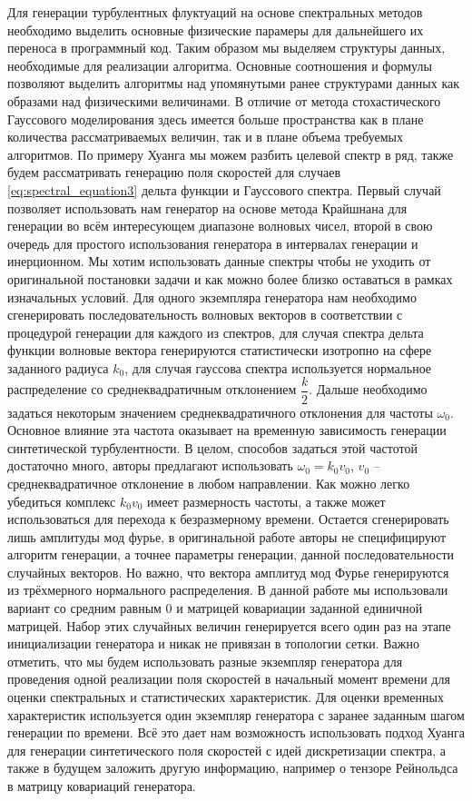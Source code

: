 Для генерации турбулентных флуктуаций на основе спектральных методов необходимо выделить основные физические парамеры для дальнейшего их переноса в программный код. Таким образом мы выделяем структуры данных, необходимые для реализации алгоритма. Основные соотношения и формулы позволяют выделить алгоритмы над упомянутыми ранее структурами данных как образами над физическими величинами. В отличие от метода стохастического Гауссового моделирования здесь имеется больше пространства как в плане количества рассматриваемых величин, так и в плане объема требуемых алгоритмов. По примеру Хуанга мы можем разбить целевой спектр в ряд, также будем рассматривать генерацию поля скоростей для случаев \eqref{eq:spectral_equation3} дельта функции и Гауссового спектра. Первый случай позволяет использовать нам генератор на основе метода Крайшнана для генерации во всём интересующем диапазоне волновых чисел, второй в свою очередь для простого использования генератора в интервалах генерации и инерционном. Мы хотим использовать данные спектры чтобы не уходить от оригинальной постановки задачи и как можно более близко оставаться в рамках изначальных условий. Для одного экземпляра генератора нам необходимо сгенерировать последовательность волновых векторов в соответствии с процедурой генерации для каждого из спектров, для случая спектра дельта функции волновые вектора генерируются статистически изотропно на сфере заданного радиуса $k_0$, для случая гауссова спектра используется нормальное распределение со среднеквадратичным отклонением $\dfrac{k}{2}$. Дальше необходимо задаться некоторым значением среднеквадратичного отклонения для частоты $\omega_0$. Основное влияние эта частота оказывает на временную зависимость генерации синтетической турбулентности. В целом, способов задаться этой частотой достаточно много, авторы предлагают использовать $\omega_0 = k_0 v_0$, $v_0$ -- среднеквадратичное отклонение в любом направлении. Как можно легко убедиться комплекс $k_0 v_0$ имеет размерность частоты, а также может использоваться для перехода к безразмерному времени. Остается сгенерировать лишь амплитуды мод фурье, в оригинальной работе авторы не специфицируют алгоритм генерации, а точнее параметры генерации, данной последовательности случайных векторов. Но важно, что вектора амплитуд мод Фурье генерируются из трёхмерного нормального распределения. В данной работе мы использовали вариант со средним равным 0 и матрицей ковариации заданной единичной матрицей. Набор этих случайных величин генерируется всего один раз на этапе инициализации генератора и никак не привязан в топологии сетки. Важно отметить, что мы будем использовать разные экземпляр генератора для проведения одной реализации поля скоростей в начальный момент времени для оценки спектральных и статистических характеристик. Для оценки временных характеристик используется один экземпляр генератора с заранее заданным шагом генерации по времени. 
Всё это дает нам возможность использовать подход Хуанга для генерации синтетического поля скоростей с идей дискретизации спектра, а также в будущем заложить другую информацию, например о тензоре Рейнольдса в матрицу ковариаций генератора. 

